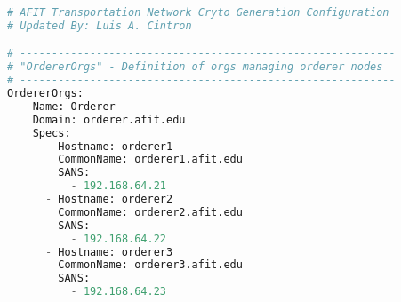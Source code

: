 \begin{lstlisting}[language=python]
# AFIT Transportation Network Cryto Generation Configuration
# Updated By: Luis A. Cintron

# -----------------------------------------------------------
# "OrdererOrgs" - Definition of orgs managing orderer nodes
# -----------------------------------------------------------
OrdererOrgs:
  - Name: Orderer
    Domain: orderer.afit.edu
    Specs:
      - Hostname: orderer1
        CommonName: orderer1.afit.edu
        SANS:
          - 192.168.64.21
      - Hostname: orderer2
        CommonName: orderer2.afit.edu
        SANS:
          - 192.168.64.22
      - Hostname: orderer3
        CommonName: orderer3.afit.edu
        SANS:
          - 192.168.64.23

\end{lstlisting}
